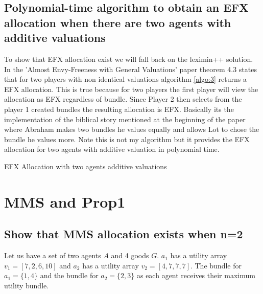 \documentclass{article}
\begin{document}
\subsection{Polynomial-time algorithm to obtain an EFX allocation when there are two agents with additive valuations}
To show that EFX allocation exist we will fall back on the leximin++ solution. In the 'Almost Envy-Freeness with General Valuations' paper theorem 4.3 states that for two players with non identical valuations algorithm \ref{algo:3} returns a EFX allocation. This is true because for two players the first player will view the allocation as EFX regardless of bundle. Since Player 2 then selects from the player 1 created bundles the resulting allocation is EFX. Basically its the implementation of the biblical story mentioned at the beginning of the paper where Abraham makes two bundles he values equally and allows Lot to chose the bundle he values more. Note this is not my algorithm but it provides the EFX allocation for two agents with additive valuation in polynomial time.

\begin{algorithm}[H]
\label{algo:2}
\EndIf
{}
\EndIf
\EndFor
{}
\EndFunction
\end{algorithm}
\begin{algorithm}[H]
\label{algo:3}
\Else
{}
\caption{EFX Allocation with two agents additive valuations}
\end{algorithm}
\section{MMS and Prop1}
\subsection{Show that MMS allocation exists when n=2}
Let us have a set of two agents $A$ and 4 goods $G$. $a_1$ has a utility array $v_1 = [7, 2, 6 ,10]$ and $a_2$ has a utility array $v_2= [4, 7, 7, 7]$. The bundle for $a_1 = \{1, 4 \}$ and the bundle for $a_2= \{2, 3\}$ as each agent receives their maximum utility bundle.
\end{document}
